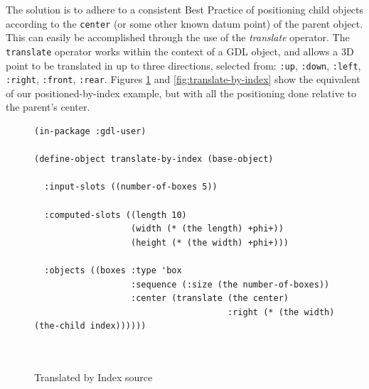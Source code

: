 \documentclass [11pt]{book}
\begin{document}
The solution is to adhere to a consistent Best Practice of positioning child objects according to the \texttt{center} (or some other known datum point) of the parent
	 object. This can easily be accomplished through the use of
	 the \emph{translate} operator. The \texttt{translate} operator works within the context of a GDL object, and
	 allows a 3D point to be translated in up to three directions, selected from: \texttt{:up}, \texttt{:down}, \texttt{:left}, \texttt{:right}, \texttt{:front}, \texttt{:rear}. Figures 
\ref{fig:translate-by-index-source} and 
\ref{fig:translate-by-index} show the equivalent of our positioned-by-index example, but
with all the positioning done relative to the parent's center.\begin{figure}\begin{lrbox}{\boxedverb}
\begin{minipage}{\linewidth}\begin{verbatim}(in-package :gdl-user)

(define-object translate-by-index (base-object)
  
  :input-slots ((number-of-boxes 5))

  :computed-slots ((length 10)
                   (width (* (the length) +phi+))
                   (height (* (the width) +phi+)))

  :objects ((boxes :type 'box
                   :sequence (:size (the number-of-boxes))
                   :center (translate (the center) 
                                      :right (* (the width) (the-child index))))))
            
                 

\end{verbatim}\end{minipage}
\end{lrbox}
\fbox{\usebox{\boxedverb}}

\caption{Translated by Index source}

\label{fig:translate-by-index-source}

\end{figure}
\end{document}
